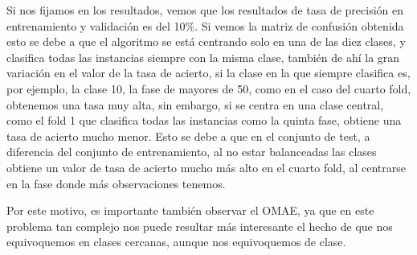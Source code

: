 


Si nos fijamos en los resultados, vemos que los resultados de tasa de precisión en entrenamiento y validación es del 10\%. Si vemos la matriz de confusión obtenida esto se debe a que el algoritmo se está centrando solo en una de las diez clases, y clasifica todas las instancias siempre con la misma clase, también de ahí la gran variación en el valor de la tasa de acierto, si la clase en la que siempre clasifica es, por ejemplo, la clase 10, la fase de mayores de 50, como en el caso del cuarto fold, obtenemos una tasa muy alta, sin embargo, si se centra en una clase central, como el fold 1 que clasifica todas las instancias como la quinta fase, obtiene una tasa de acierto mucho menor. Esto se debe a que en el conjunto de test, a diferencia del conjunto de entrenamiento, al no estar balanceadas las clases obtiene un valor de tasa de acierto mucho más alto en el cuarto fold, al centrarse en la fase donde más observaciones tenemos.

Por este motivo, es importante también observar el OMAE, ya que en este problema tan complejo nos puede resultar más interesante el hecho de que nos equivoquemos en clases cercanas, aunque nos equivoquemos de clase.


